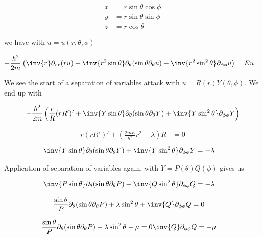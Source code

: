 \begin{align*}
x &= r \sin\theta \cos\phi \\
y &= r \sin\theta \sin\phi \\
z &= r \cos\theta
\end{align*}

we have with $u = u(r,\theta, \phi)$

\begin{align*}
-\frac{\hbar^2}{2m} \left( 
\inv{r} \partial_{rr} (r u) +  \inv{r^2 \sin\theta} \partial_\theta (\sin\theta \partial_\theta u) 
+ \inv{r^2 \sin^2\theta} \partial_{\phi\phi} u
 \right)
&= E u
\end{align*}

We see the start of a separation of variables attack with $u = R(r) Y(\theta, \phi)$.  We end up with

\begin{align*}
-\frac{\hbar^2}{2m} &\left( 
\frac{r}{R} (r R')' +  \inv{Y \sin\theta} \partial_\theta (\sin\theta \partial_\theta Y) 
+ \inv{Y \sin^2\theta} \partial_{\phi\phi} Y
 \right) \\
\end{align*}

\begin{align*}
r (r R')' + \left( \frac{2m E}{\hbar^2} r^2 - \lambda \right) R &= 0
\end{align*}
\begin{align*}
\inv{Y \sin\theta} \partial_\theta (\sin\theta \partial_\theta Y) + \inv{Y \sin^2\theta} \partial_{\phi\phi} Y &= -\lambda
\end{align*}

Application of separation of variables again, with $Y = P(\theta) Q(\phi)$ gives us

\begin{align*}
\inv{P \sin\theta} \partial_\theta (\sin\theta \partial_\theta P) + \inv{Q \sin^2\theta} \partial_{\phi\phi} Q &= -\lambda 
\end{align*}

\begin{align*}
\frac{\sin\theta}{P } \partial_\theta (\sin\theta \partial_\theta P) 
+\lambda  \sin^2\theta
+ \inv{Q } \partial_{\phi\phi} Q &= 0
\end{align*}

\begin{align*}
\frac{\sin\theta}{P } \partial_\theta (\sin\theta \partial_\theta P) + \lambda \sin^2\theta - \mu = 0
\inv{Q } \partial_{\phi\phi} Q &= -\mu
\end{align*}

